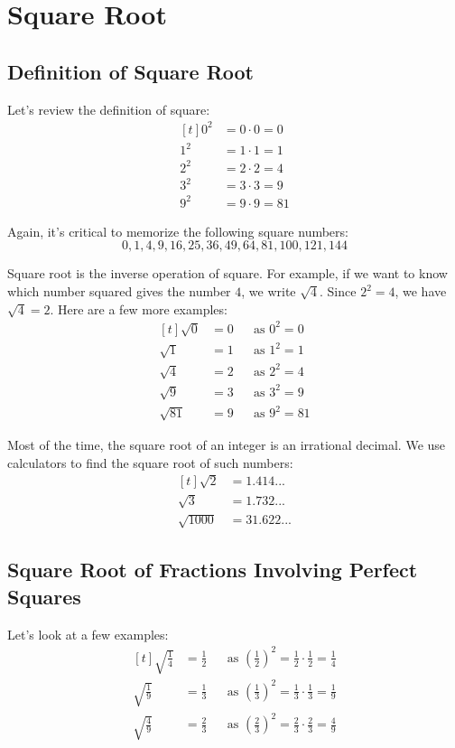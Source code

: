 
\section{Square Root}

\subsection{Definition of Square Root}
Let's review the definition of square:
\[
\begin{aligned}[t]
	0^{2} &= 0\cdot0 = 0 \\
	1^{2} &= 1\cdot1 = 1 \\
	2^{2} &= 2\cdot2 = 4 \\
	3^{2} &= 3\cdot3 = 9 \\
	9^{2} &= 9\cdot9 = 81
\end{aligned}
\]

Again, it's critical to memorize the following square numbers: \[0,1,4,9,16,25,36,49,64,81,100,121,144\]

Square root is the inverse operation of square. For example, if we want to know which number squared gives the number $4$, we write $\sqrt{4}$. Since $2^{2}=4$, we have $\sqrt{4}=2$. Here are a few more examples:
\[
\begin{aligned}[t]
	\sqrt{0} &= 0 && \text{as } 0^{2}=0 \\
	\sqrt{1} &= 1 && \text{as } 1^{2}=1 \\
	\sqrt{4} &= 2 && \text{as } 2^{2}=4 \\
	\sqrt{9} &= 3 && \text{as } 3^{2}=9 \\
	\sqrt{81} &= 9 && \text{as } 9^{2}=81
\end{aligned}
\]

Most of the time, the square root of an integer is an irrational decimal. We use calculators to find the square root of such numbers:
\[
\begin{aligned}[t]
	\sqrt{2} &= 1.414...\\
	\sqrt{3} &= 1.732...\\
	\sqrt{1000} &= 31.622...
\end{aligned}
\]

\subsection{Square Root of Fractions Involving Perfect Squares}
Let's look at a few examples:
\[
\begin{aligned}[t]
	\sqrt{\frac{1}{4}} &= \frac{1}{2} && \text{as } \left( \frac{1}{2} \right)^{2}=\frac{1}{2} \cdot \frac{1}{2} = \frac{1}{4} \\
	\sqrt{\frac{1}{9}} &= \frac{1}{3} && \text{as } \left(\frac{1}{3}\right)^{2}=\frac{1}{3} \cdot \frac{1}{3} = \frac{1}{9} \\
	\sqrt{\frac{4}{9}} &= \frac{2}{3} && \text{as } \left(\frac{2}{3}\right)^{2}=\frac{2}{3} \cdot \frac{2}{3} = \frac{4}{9} \\
\end{aligned}
\]

